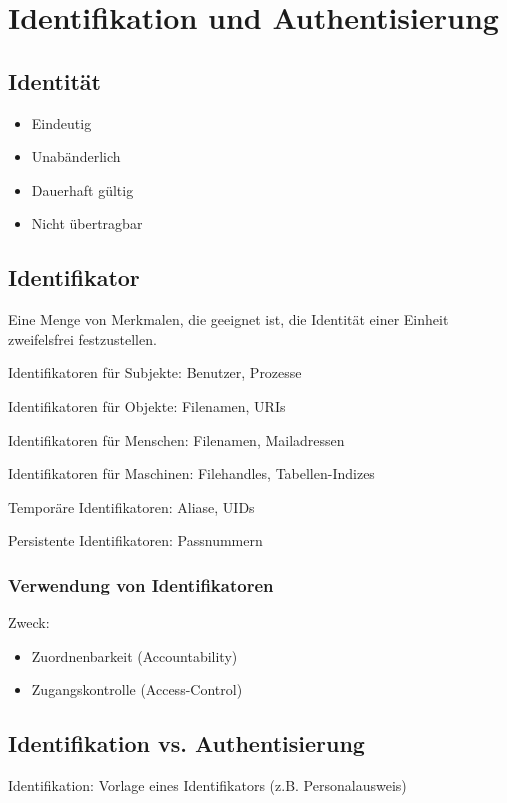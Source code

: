 \chapter{Identifikation und Authentisierung}
\section{Identität}
\begin{itemize}
    \item Eindeutig
    \item Unabänderlich
    \item Dauerhaft gültig
    \item Nicht übertragbar
\end{itemize}

\section{Identifikator}
Eine Menge von Merkmalen, die geeignet ist, die Identität einer Einheit zweifelsfrei festzustellen.

\vspace{.3cm}

Identifikatoren für Subjekte: Benutzer, Prozesse

Identifikatoren für Objekte: Filenamen, URIs

\vspace{.3cm}

Identifikatoren für Menschen: Filenamen, Mailadressen

Identifikatoren für Maschinen: Filehandles, Tabellen-Indizes

\vspace{.3cm}

Temporäre Identifikatoren: Aliase, UIDs

Persistente Identifikatoren: Passnummern

\subsection{Verwendung von Identifikatoren}
Zweck:
\begin{itemize}
    \item Zuordnenbarkeit (Accountability)
    \item Zugangskontrolle (Access-Control)
\end{itemize}

\section{Identifikation vs. Authentisierung}
Identifikation: Vorlage eines Identifikators (z.B. Personalausweis)


